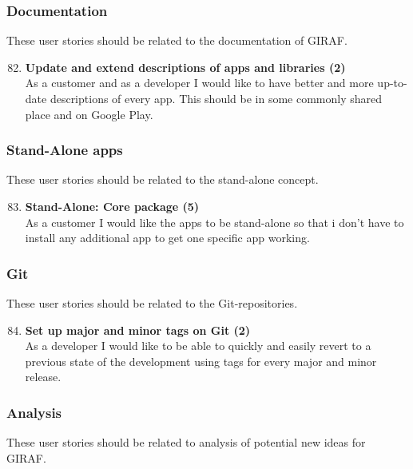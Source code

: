 \subsubsection{Documentation}
These user stories should be related to the documentation of GIRAF.

\begin{enumerate}
	\setcounter{enumi}{81} %
	\item \textbf{Update and extend descriptions of apps and libraries (2)}\\
	As a customer and as a developer I would like to have better and more up-to-date descriptions of every app. This should be in some commonly shared place and on Google Play.
\end{enumerate}

\subsubsection{Stand-Alone apps}
These user stories should be related to the stand-alone concept.

\begin{enumerate}
	\setcounter{enumi}{82} %
	\item \textbf{Stand-Alone: Core package (5)}\\
	As a customer I would like the apps to be stand-alone so that i don't have to install any additional app to get one specific app working.
\end{enumerate}

\subsubsection{Git}
These user stories should be related to the Git-repositories.
 
\begin{enumerate}
	\setcounter{enumi}{83} %
	\item \textbf{Set up major and minor tags on Git (2)}\\
	As a developer I would like to be able to quickly and easily revert to a previous state of the development using tags for every major and minor release.
\end{enumerate}

\subsubsection{Analysis}
These user stories should be related to analysis of potential new ideas for GIRAF.


